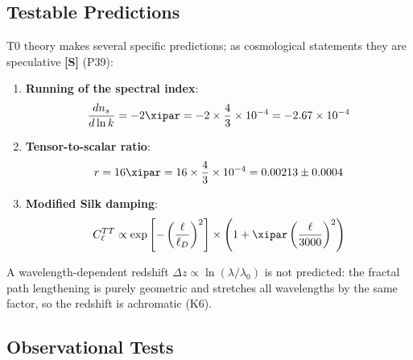 	\subsection{Testable Predictions}
	
	T0 theory makes several specific predictions; as cosmological statements they are speculative \textbf{[S]} (P39):
	
	\begin{enumerate}
		\item \textbf{Running of the spectral index}:
		\begin{equation}
			\frac{dn_s}{d\ln k} = -2\xipar = -2 \times \frac{4}{3} \times 10^{-4} = -2.67 \times 10^{-4}
		\end{equation}
		
		\item \textbf{Tensor-to-scalar ratio}:
		\begin{equation}
			r = 16\xipar = 16 \times \frac{4}{3} \times 10^{-4} = 0.00213 \pm 0.0004
		\end{equation}
		
		\item \textbf{Modified Silk damping}:
		\begin{equation}
			C_\ell^{TT} \propto \exp\left[-\left(\frac{\ell}{\ell_D}\right)^2\right] \times \left(1 + \xipar \left(\frac{\ell}{3000}\right)^2\right)
		\end{equation}
	\end{enumerate}
	
	A wavelength-dependent redshift $\Delta z \propto \ln(\lambda/\lambda_0)$ is not predicted: the fractal path lengthening is purely geometric and stretches all wavelengths by the same factor, so the redshift is achromatic (K6).
	
	\subsection{Observational Tests}
	
	\begin{table}[htbp]
		\centering
		\caption{T0 predictions vs observations}
	\end{table}
	
